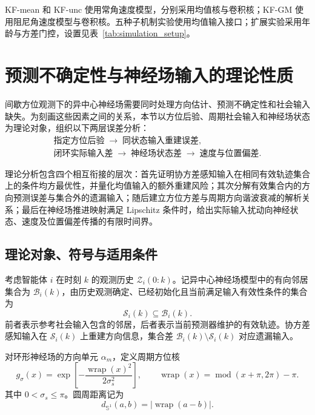 \documentclass[UTF8,fontset=windows,11pt]{ctexart}
\newcommand{\Sone}{\mathbb S^1}
\begin{document}
KF-mean 和 KF-unc 使用常角速度模型，分别采用均值核与卷积核；KF-GM 使用阻尼角速度模型与卷积核。五种子机制实验使用均值输入接口；扩展实验采用年龄与方差门控，设置见表~\ref{tab:simulation_setup}。

\section{预测不确定性与神经场输入的理论性质}

间歇方位观测下的异中心神经场需要同时处理方向估计、预测不确定性和社会输入缺失。为刻画这些因素之间的关系，本节以方位后验、周期社会输入和神经场状态为理论对象，组织以下两层误差分析：
\[
\begin{gathered}
\text{指定方位后验}\;\longrightarrow\;\text{同状态输入重建误差},\\
\text{闭环实际输入差}\;\longrightarrow\;\text{神经场状态差}\;\longrightarrow\;\text{速度与位置偏差}.
\end{gathered}
\]

理论分析包含四个相互衔接的层次：首先证明协方差感知输入在相同有效轨迹集合上的条件均方最优性，并量化均值输入的额外重建风险；其次分解有效集合内的方向预测误差与集合外的遗漏输入；随后建立方位方差与周期方向谐波衰减的解析关系；最后在神经场推进映射满足 Lipschitz 条件时，给出实际输入扰动向神经状态、速度及位置偏差传播的有限时间界。

\subsection{理论对象、符号与适用条件}

考虑智能体 $i$ 在时刻 $k$ 的观测历史 $\mathcal Z_i(0:k)$。记异中心神经场模型中的有向邻居集合为 $\mathcal B_i(k)$，由历史观测确定、已经初始化且当前满足输入有效性条件的集合为
\[
\mathcal S_i(k)\subseteq\mathcal B_i(k).
\]
前者表示参考社会输入包含的邻居，后者表示当前预测器维护的有效轨迹。协方差感知输入在 $\mathcal S_i(k)$ 上重建方向信息，集合差 $\mathcal B_i(k)\setminus\mathcal S_i(k)$ 对应遗漏输入。

对环形神经场的方向单元 $\alpha_m$，定义周期方位核
\begin{equation}
 g_\sigma(x)=\exp\!\left[-\frac{\operatorname{wrap}(x)^2}{2\sigma_s^2}\right],
 \qquad
 \operatorname{wrap}(x)=\operatorname{mod}(x+\pi,2\pi)-\pi .
 \label{eq:v2_kernel}
\end{equation}
其中 $0<\sigma_s\leq\pi$。圆周距离记为
\begin{equation}
 d_{\Sone}(a,b)=|\operatorname{wrap}(a-b)|.
 \label{eq:v2_circle_distance}
\end{equation}
\end{document}
